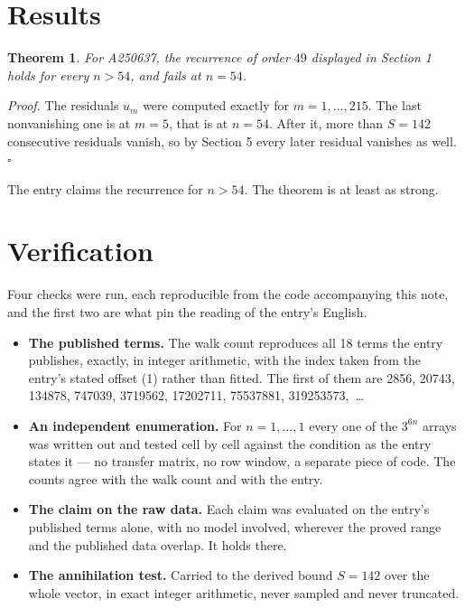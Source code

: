 \documentclass[11pt]{article}
\newtheorem{theorem}{Theorem}
\theoremstyle{definition}
\begin{document}
\section{Results}

\begin{theorem} For A250637, the recurrence of order $49$ displayed in Section 1 holds for every $n > 54$, and fails at $n = 54$.\end{theorem}

{\itshape Proof.} The residuals $u_m$ were computed exactly for $m = 1,\dots,215$. The last nonvanishing one is at $m = 5$, that is at $n = 54$. After it, more than $S = 142$ consecutive residuals vanish, so by Section 5 every later residual vanishes as well. $\square$

The entry claims the recurrence for $n > 54$. The theorem is at least as strong.

\section{Verification}

Four checks were run, each reproducible from the code accompanying this note, and the first two are what pin the reading of the entry's English.

\begin{itemize}

\item {\bfseries The published terms.} The walk count reproduces all 18 terms the entry publishes, exactly, in integer arithmetic, with the index taken from the entry's stated offset (1) rather than fitted. The first of them are 2856, 20743, 134878, 747039, 3719562, 17202711, 75537881, 319253573,~\dots

\item {\bfseries An independent enumeration.} For $n = 1,\dots,1$ every one of the $3^{6n}$ arrays was written out and tested cell by cell against the condition as the entry states it --- no transfer matrix, no row window, a separate piece of code. The counts agree with the walk count and with the entry.

\item {\bfseries The claim on the raw data.} Each claim was evaluated on the entry's published terms alone, with no model involved, wherever the proved range and the published data overlap. It holds there.

\item {\bfseries The annihilation test.} Carried to the derived bound $S = 142$ over the whole vector, in exact integer arithmetic, never sampled and never truncated.

\end{itemize}
\end{document}
